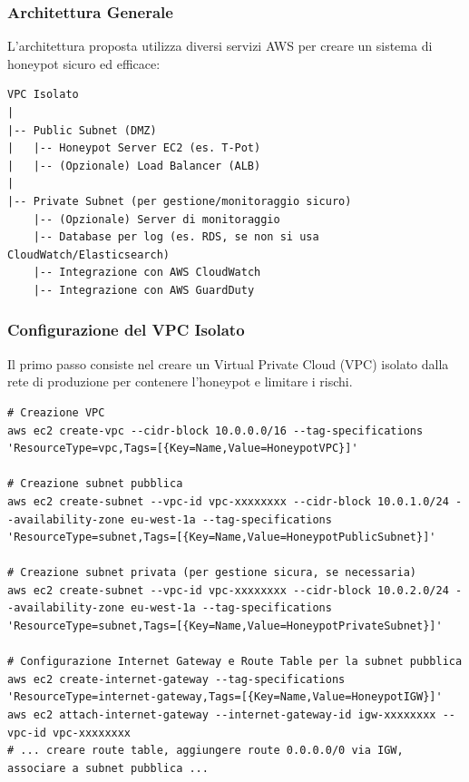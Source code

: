 \documentclass[a4paper,12pt]{report}
\begin{document}
\subsubsection{Architettura Generale}
\label{subsubsec:architettura}

L'architettura proposta utilizza diversi servizi AWS per creare un sistema di honeypot sicuro ed efficace:

\begin{verbatim}
VPC Isolato
|
|-- Public Subnet (DMZ)
|   |-- Honeypot Server EC2 (es. T-Pot)
|   |-- (Opzionale) Load Balancer (ALB)
|
|-- Private Subnet (per gestione/monitoraggio sicuro)
    |-- (Opzionale) Server di monitoraggio
    |-- Database per log (es. RDS, se non si usa CloudWatch/Elasticsearch)
    |-- Integrazione con AWS CloudWatch
    |-- Integrazione con AWS GuardDuty
\end{verbatim}

\subsubsection{Configurazione del VPC Isolato}
\label{subsubsec:config_vpc}

Il primo passo consiste nel creare un Virtual Private Cloud (VPC) isolato dalla rete di produzione per contenere l'honeypot e limitare i rischi.

\begin{lstlisting}[caption={Comandi AWS CLI (esemplificativi) per la creazione di un VPC isolato}, label=lst:vpc_setup]
# Creazione VPC
aws ec2 create-vpc --cidr-block 10.0.0.0/16 --tag-specifications 'ResourceType=vpc,Tags=[{Key=Name,Value=HoneypotVPC}]'

# Creazione subnet pubblica
aws ec2 create-subnet --vpc-id vpc-xxxxxxxx --cidr-block 10.0.1.0/24 --availability-zone eu-west-1a --tag-specifications 'ResourceType=subnet,Tags=[{Key=Name,Value=HoneypotPublicSubnet}]'

# Creazione subnet privata (per gestione sicura, se necessaria)
aws ec2 create-subnet --vpc-id vpc-xxxxxxxx --cidr-block 10.0.2.0/24 --availability-zone eu-west-1a --tag-specifications 'ResourceType=subnet,Tags=[{Key=Name,Value=HoneypotPrivateSubnet}]'

# Configurazione Internet Gateway e Route Table per la subnet pubblica
aws ec2 create-internet-gateway --tag-specifications 'ResourceType=internet-gateway,Tags=[{Key=Name,Value=HoneypotIGW}]'
aws ec2 attach-internet-gateway --internet-gateway-id igw-xxxxxxxx --vpc-id vpc-xxxxxxxx
# ... creare route table, aggiungere route 0.0.0.0/0 via IGW, associare a subnet pubblica ...
\end{lstlisting}
\end{document}

